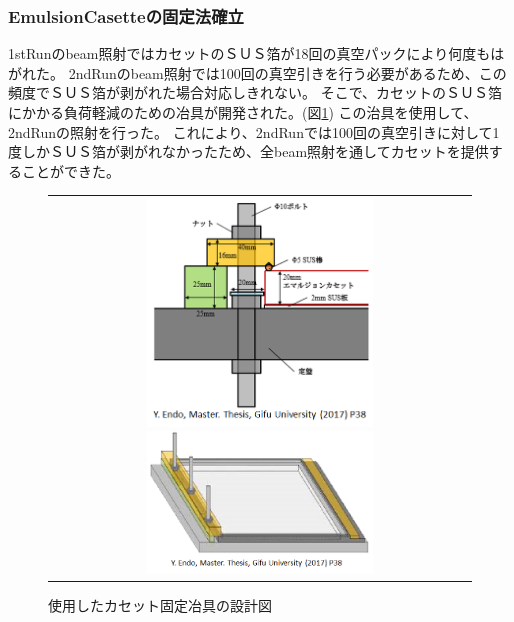 \documentclass[12pt,a4paper]{jarticle}
\begin{document}
\subsubsection{EmulsionCasetteの固定法確立}
1stRunのbeam照射ではカセットのＳＵＳ箔が18回の真空パックにより何度もはがれた。
2ndRunのbeam照射では100回の真空引きを行う必要があるため、この頻度でＳＵＳ箔が剥がれた場合対応しきれない。
そこで、カセットのＳＵＳ箔にかかる負荷軽減のための冶具が開発された。(図\ref{fig:casette_fix})
この治具を使用して、2ndRunの照射を行った。
これにより、2ndRunでは100回の真空引きに対して1度しかＳＵＳ箔が剥がれなかったため、全beam照射を通してカセットを提供することができた。
\begin{figure}[htbp]
  \centering
      \begin{tabular}{c}
        \begin{minipage}{0.5\hsize}
          \centering
            \includegraphics[clip, width=60mm]{casette_fix_moderu.png}
        \end{minipage}
        
        \begin{minipage}{0.5\hsize}
          \centering
            \includegraphics[clip, width=60mm]{casettefix.png}
        \end{minipage}
    
      \end{tabular}
      \caption{使用したカセット固定冶具の設計図\label{fig:casette_fix}}
\end{figure}
\newpage
\end{document}
